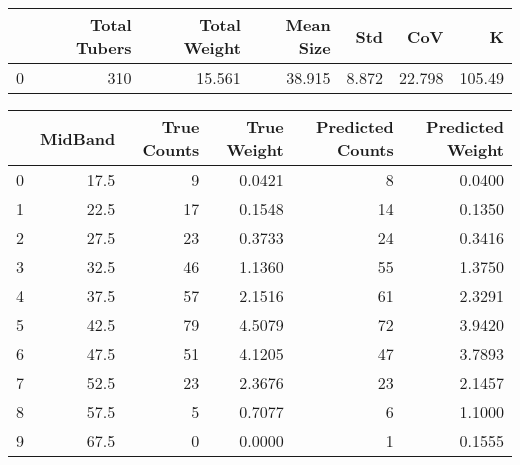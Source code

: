 \begin{tabular}{lrrrrrr}
\toprule
{} &  Total Tubers &  Total Weight &  Mean Size &    Std &     CoV &       K \\
\midrule
0 &           310 &        15.561 &     38.915 &  8.872 &  22.798 &  105.49 \\
\bottomrule
\end{tabular}

\begin{tabular}{lrrrrr}
\toprule
{} &  MidBand &  True Counts &  True Weight &  Predicted Counts &  Predicted Weight \\
\midrule
0 &     17.5 &            9 &       0.0421 &                 8 &            0.0400 \\
1 &     22.5 &           17 &       0.1548 &                14 &            0.1350 \\
2 &     27.5 &           23 &       0.3733 &                24 &            0.3416 \\
3 &     32.5 &           46 &       1.1360 &                55 &            1.3750 \\
4 &     37.5 &           57 &       2.1516 &                61 &            2.3291 \\
5 &     42.5 &           79 &       4.5079 &                72 &            3.9420 \\
6 &     47.5 &           51 &       4.1205 &                47 &            3.7893 \\
7 &     52.5 &           23 &       2.3676 &                23 &            2.1457 \\
8 &     57.5 &            5 &       0.7077 &                 6 &            1.1000 \\
9 &     67.5 &            0 &       0.0000 &                 1 &            0.1555 \\
\bottomrule
\end{tabular}

